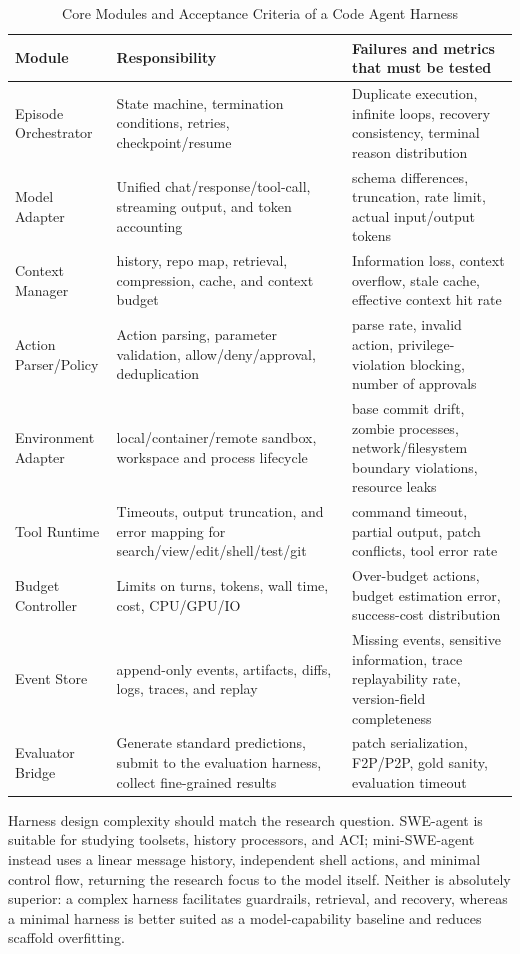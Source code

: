 \documentclass[10pt,a4paper,UTF8,fontset=none]{ctexart}
\begin{document}
\begin{table}[htbp]
\centering
\caption{Core Modules and Acceptance Criteria of a Code Agent Harness}
\label{en:tab:harness}
\small
\begin{tabularx}{\textwidth}{p{2.8cm}YY}
\toprule
Module & Responsibility & Failures and metrics that must be tested \\
\midrule
Episode Orchestrator & State machine, termination conditions, retries, checkpoint/resume & Duplicate execution, infinite loops, recovery consistency, terminal reason distribution \\
Model Adapter & Unified chat/response/tool-call, streaming output, and token accounting & schema differences, truncation, rate limit, actual input/output tokens \\
Context Manager & history, repo map, retrieval, compression, cache, and context budget & Information loss, context overflow, stale cache, effective context hit rate \\
Action Parser/Policy & Action parsing, parameter validation, allow/deny/approval, deduplication & parse rate, invalid action, privilege-violation blocking, number of approvals \\
Environment Adapter & local/container/remote sandbox, workspace and process lifecycle & base commit drift, zombie processes, network/filesystem boundary violations, resource leaks \\
Tool Runtime & Timeouts, output truncation, and error mapping for search/view/edit/shell/test/git & command timeout, partial output, patch conflicts, tool error rate \\
Budget Controller & Limits on turns, tokens, wall time, cost, CPU/GPU/IO & Over-budget actions, budget estimation error, success-cost distribution \\
Event Store & append-only events, artifacts, diffs, logs, traces, and replay & Missing events, sensitive information, trace replayability rate, version-field completeness \\
Evaluator Bridge & Generate standard predictions, submit to the evaluation harness, collect fine-grained results & patch serialization, F2P/P2P, gold sanity, evaluation timeout \\
\bottomrule
\end{tabularx}
\end{table}

Harness design complexity should match the research question. SWE-agent is suitable for studying toolsets, history processors, and ACI; mini-SWE-agent instead uses a linear message history, independent shell actions, and minimal control flow, returning the research focus to the model itself\cite{en:minisweagent2026}. Neither is absolutely superior: a complex harness facilitates guardrails, retrieval, and recovery, whereas a minimal harness is better suited as a model-capability baseline and reduces scaffold overfitting.
\end{document}
